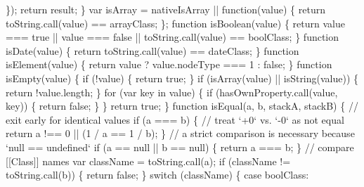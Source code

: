\begin{DoxyCodeInclude}
{{\textcolor{stringliteral}{    \});}
\textcolor{stringliteral}{    return result;}
\textcolor{stringliteral}{  \}}
\textcolor{stringliteral}{}
\textcolor{stringliteral}{  var isArray = nativeIsArray || function(value) \{}
\textcolor{stringliteral}{    return toString.call(value) == arrayClass;}
\textcolor{stringliteral}{  \};}
\textcolor{stringliteral}{}
\textcolor{stringliteral}{  function isBoolean(value) \{}
\textcolor{stringliteral}{    return value === true || value === false || toString.call(value) == boolClass;}
\textcolor{stringliteral}{  \}}
\textcolor{stringliteral}{}
\textcolor{stringliteral}{  function isDate(value) \{}
\textcolor{stringliteral}{    return toString.call(value) == dateClass;}
\textcolor{stringliteral}{  \}}
\textcolor{stringliteral}{}
\textcolor{stringliteral}{  function isElement(value) \{}
\textcolor{stringliteral}{    return value ? value.nodeType === 1 : false;}
\textcolor{stringliteral}{  \}}
\textcolor{stringliteral}{}
\textcolor{stringliteral}{  function isEmpty(value) \{}
\textcolor{stringliteral}{    if (!value) \{}
\textcolor{stringliteral}{      return true;}
\textcolor{stringliteral}{    \}}
\textcolor{stringliteral}{    if (isArray(value) || isString(value)) \{}
\textcolor{stringliteral}{      return !value.length;}
\textcolor{stringliteral}{    \}}
\textcolor{stringliteral}{    for (var key in value) \{}
\textcolor{stringliteral}{      if (hasOwnProperty.call(value, key)) \{}
\textcolor{stringliteral}{        return false;}
\textcolor{stringliteral}{      \}}
\textcolor{stringliteral}{    \}}
\textcolor{stringliteral}{    return true;}
\textcolor{stringliteral}{  \}}
\textcolor{stringliteral}{}
\textcolor{stringliteral}{  function isEqual(a, b, stackA, stackB) \{}
\textcolor{stringliteral}{    // exit early for identical values}
\textcolor{stringliteral}{    if (a === b) \{}
\textcolor{stringliteral}{      // treat `+0` vs. `-0` as not equal}
\textcolor{stringliteral}{      return a !== 0 || (1 / a == 1 / b);}
\textcolor{stringliteral}{    \}}
\textcolor{stringliteral}{    // a strict comparison is necessary because `null == undefined`}
\textcolor{stringliteral}{    if (a == null || b == null) \{}
\textcolor{stringliteral}{      return a === b;}
\textcolor{stringliteral}{    \}}
\textcolor{stringliteral}{    // compare [[Class]] names}
\textcolor{stringliteral}{    var className = toString.call(a);}
\textcolor{stringliteral}{    if (className != toString.call(b)) \{}
\textcolor{stringliteral}{      return false;}
\textcolor{stringliteral}{    \}}
\textcolor{stringliteral}{    switch (className) \{}
\textcolor{stringliteral}{      case boolClass:}
}}
\end{DoxyCodeInclude}
